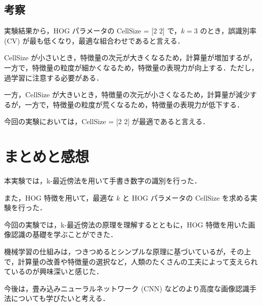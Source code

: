 \documentclass[fleqn, a4paper. 12pt]{jsarticle}
\begin{document}
    \subsection{考察}

      実験結果から，HOG パラメータの CellSize = [2 2] で，$k = 3$ のとき，誤識別率 (CV) が最も低くなり，最適な組合わせであると言える．

      CellSize が小さいとき，特徴量の次元が大きくなるため，計算量が増加するが，一方で，特徴量の粒度が細かくなるため，特徴量の表現力が向上する．ただし，過学習に注意する必要がある．

      一方，CellSize が大きいとき，特徴量の次元が小さくなるため，計算量が減少するが，一方で，特徴量の粒度が荒くなるため，特徴量の表現力が低下する．

      今回の実験においては，CellSize = [2 2] が最適であると言える．
      
  \section{まとめと感想}

    本実験では，k-最近傍法を用いて手書き数字の識別を行った．

    また，HOG 特徴を用いて，最適な $k$ と HOG パラメータの CellSize を求める実験を行った．

    今回の実験では，k-最近傍法の原理を理解するとともに，HOG 特徴を用いた画像認識の基礎を学ぶことができた．

    機械学習の仕組みは，つきつめるとシンプルな原理に基づいているが，その上で，計算量の改善や特徴量の選択など，人類のたくさんの工夫によって支えられているのが興味深いと感じた．

    今後は，畳み込みニューラルネットワーク (CNN) などのより高度な画像認識手法についても学びたいと考える．
\end{document}
